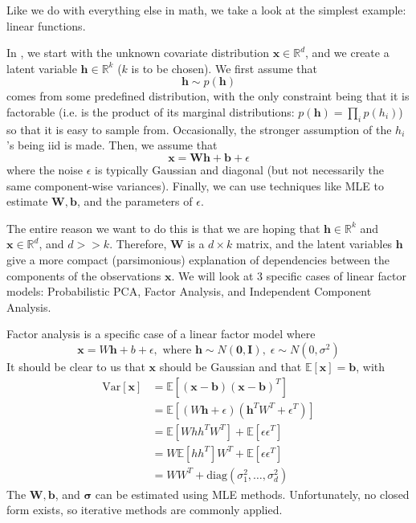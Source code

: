\documentclass{article}
\begin{document}
    Like we do with everything else in math, we take a look at the simplest example: linear functions. 

    In , we start with the unknown covariate distribution $\mathbf{x} \in \mathbb{R}^d$, and we create a latent variable $\mathbf{h} \in \mathbb{R}^k$ ($k$ is to be chosen). We first assume that 
    \[\mathbf{h} \sim p(\mathbf{h})\] 
    comes from some predefined distribution, with the only constraint being that it is factorable (i.e. is the product of its marginal distributions: $p(\mathbf{h}) = \prod_i p(h_i)$) so that it is easy to sample from. Occasionally, the stronger assumption of the $h_i$'s being iid is made. Then, we assume that 
    \[\mathbf{x} = \mathbf{W} \mathbf{h} + \mathbf{b} + \epsilon\] 
    where the noise $\epsilon$ is typically Gaussian and diagonal (but not necessarily the same component-wise variances). Finally, we can use techniques like MLE to estimate $\mathbf{W}, \mathbf{b}$, and the parameters of $\epsilon$.  

    The entire reason we want to do this is that we are hoping that $\mathbf{h} \in \mathbb{R}^k$ and $\mathbf{x} \in \mathbb{R}^d$, and $d >> k$. Therefore, $\mathbf{W}$ is a $d \times k$ matrix, and the latent variables $\mathbf{h}$ give a more compact (parsimonious)  explanation of dependencies between the components of the observations $\mathbf{x}$. We will look at 3 specific cases of linear factor models: Probabilistic PCA, Factor Analysis, and Independent Component Analysis. 


    \begin{example} 
      Factor analysis is a specific case of a linear factor model where 
      \[\mathbf{x} = W \mathbf{h} + b + \epsilon, \text{ where } \mathbf{h} \sim N(\mathbf{0}, \mathbf{I}), \; \epsilon \sim N(0, \sigma^2)\] 
      It should be clear to us that $\mathbf{x}$ should be Gaussian and that $\mathbb{E}[\mathbf{x}] = \mathbf{b}$, with 
      \begin{align*} 
          \mathrm{Var}[\mathbf{x}] & = \mathbb{E}[ (\mathbf{x} - \mathbf{b})( \mathbf{x} - \mathbf{b})^T ] \\
                                   & = \mathbb{E}[ (W \mathbf{h} + \epsilon) (\mathbf{h}^T W^T + \epsilon^T)] \\
                                   & = \mathbb{E}[W h h^T W^T] + \mathbb{E}[ \epsilon \epsilon^T] \\
                                   & = W \mathbb{E}[ h h^T] W^T + \mathbb{E}[ \epsilon \epsilon^T] \\
                                   & = W W^T + \mathrm{diag}(\sigma_1^2, \ldots, \sigma_d^2) 
      \end{align*} 
      The $\mathbf{W}, \mathbf{b}$, and $\boldsymbol{\sigma}$ can be estimated using MLE methods. Unfortunately, no closed form  exists, so iterative methods are commonly applied. 
    \end{example} 
\end{document}
